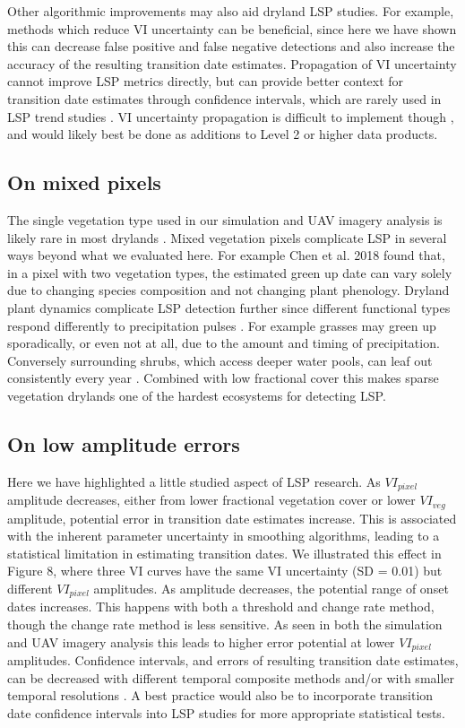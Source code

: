\documentclass{article}
\begin{document}
Other algorithmic improvements may also aid dryland LSP studies. For example, methods which reduce VI uncertainty can be beneficial, since here we have shown this can decrease false positive and false negative detections and also increase the accuracy of the resulting transition date estimates. Propagation of VI uncertainty cannot improve LSP metrics directly, but can provide better context for transition date estimates through confidence intervals, which are rarely used in LSP trend studies \cite{cortes2021}. VI uncertainty propagation is difficult to implement though \cite{borgogno-mondino2016}, and would likely best be done as additions to Level 2 or higher data products. 

\subsection{On mixed pixels}

The single vegetation type used in our simulation and UAV imagery analysis is likely rare in most drylands \cite{jones2018}. Mixed vegetation pixels complicate LSP in several ways beyond what we evaluated here. For example Chen et al. 2018 \cite{chen-wang2018} found that, in a pixel with two vegetation types, the estimated green up date can vary solely due to changing species composition and not changing plant phenology. Dryland plant dynamics complicate LSP detection further since different functional types respond differently to precipitation pulses \cite{helman2018}. For example grasses may green up sporadically, or even not at all, due to the amount and timing of precipitation. Conversely surrounding shrubs, which access deeper water pools, can leaf out consistently every year \cite{ogle2004, lauenroth2014, moreno2015}. Combined with low fractional cover this makes sparse vegetation drylands one of the hardest ecosystems for detecting LSP.

\subsection{On low amplitude errors}
Here we have highlighted a little studied aspect of LSP research. As $VI_{pixel}$ amplitude decreases, either from lower fractional vegetation cover or lower $VI_{veg}$ amplitude, potential error in transition date estimates increase. This is associated with the inherent parameter uncertainty in smoothing algorithms, leading to a statistical limitation in estimating transition dates. We illustrated this effect in Figure 8, where three VI curves have the same VI uncertainty (SD = 0.01) but different $VI_{pixel}$ amplitudes. As amplitude decreases, the potential range of onset dates increases. This happens with both a threshold and change rate method, though the change rate method is less sensitive. As seen in both the simulation and UAV imagery analysis this leads to higher error potential at lower $VI_{pixel}$ amplitudes. Confidence intervals, and errors of resulting transition date estimates, can be decreased with different temporal composite methods and/or with smaller temporal resolutions \cite{zhang-friedl2009}. A best practice would also be to incorporate transition date confidence intervals into LSP studies for more appropriate statistical tests.
\end{document}
